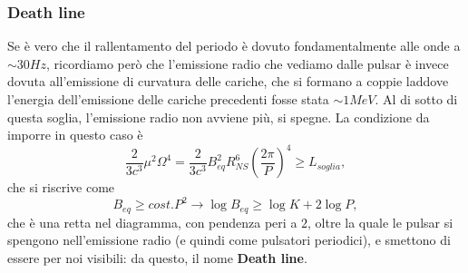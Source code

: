 \subsubsection{Death line}
Se è vero che il rallentamento del periodo è dovuto fondamentalmente alle onde a $\sim30Hz$, ricordiamo però che l'emissione radio che vediamo dalle pulsar è invece dovuta all'emissione di curvatura delle cariche, che si formano a coppie laddove l'energia dell'emissione delle cariche precedenti fosse stata $\sim 1MeV$.
Al di sotto di questa soglia, l'emissione radio non avviene più, si spegne.
La condizione da imporre in questo caso è
\begin{equation}
    \frac{2}{3c^3}\mu^2\Omega^4 = \frac{2}{3c^3}B_{eq}^2R_{NS}^6\left(\frac{2\pi}{P}\right)^4\geq L_{soglia},
\end{equation}
che si riscrive come
\begin{equation}
    B_{eq}\geq cost.P^2 \xrightarrow{} \log B_{eq} \geq \log K+ 2\log P,
\end{equation}
che è una retta nel diagramma, con pendenza peri a $2$, oltre la quale le pulsar si spengono nell'emissione radio (e quindi come pulsatori periodici), e smettono di essere per noi visibili: da questo, il nome \textbf{Death line}.

